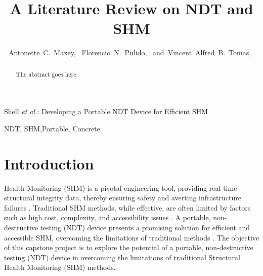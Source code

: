 \documentclass[journal, a4paper]{IEEEtran}
\begin{document}
\title{A Literature Review on NDT and SHM}


\author{Antonette~C.~Maxey,~
        Florencio~N.~Pulido,~
        and~Vincent~Alfred~B.~Tomas,~%
}



%
{Shell \MakeLowercase{\textit{et al.}}: Developing a Portable NDT Device for Efficient SHM}


\maketitle


\begin{abstract}
The abstract goes here. \lipsum[1]
\end{abstract}


\begin{IEEEkeywords}
  NDT, SHM,Portable, Concrete.
\end{IEEEkeywords}







\section{Introduction}
 Health Monitoring (SHM) is a pivotal engineering tool, providing real-time structural integrity data,
thereby ensuring safety and averting infrastructure failures \cite{Gharehbaghi2022} \cite{Katam2023}.
Traditional SHM methods, while effective, are often limited by factors such as
high cost, complexity, and accessibility issues \cite{Katam2023} \cite{Gharehbaghi2022}.
A portable, non-destructive testing (NDT) device presents a promising solution for efficient and accessible SHM,
overcoming the limitations of traditional methods \cite{Guo2022} \cite{Chen2023}.
The objective of this capstone project is to explore the potential of a portable,
non-destructive testing (NDT) device in overcoming the limitations of traditional Structural Health Monitoring (SHM) methods.
\end{document}
